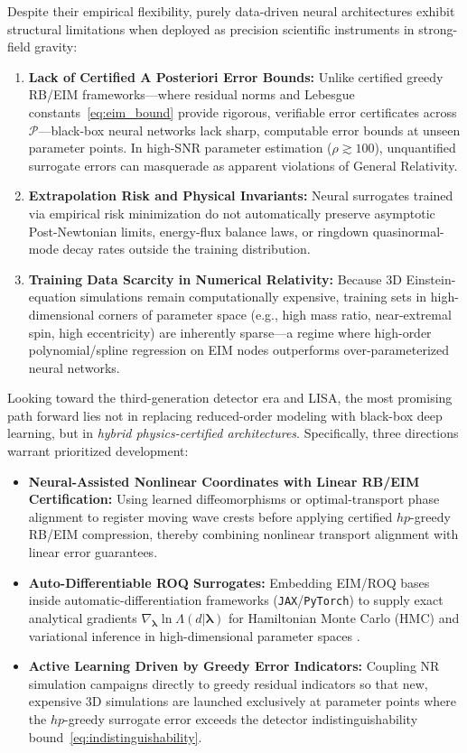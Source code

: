 \documentclass[11pt, a4paper]{article}
\begin{document}
Despite their empirical flexibility, purely data-driven neural architectures exhibit structural limitations when deployed as precision scientific instruments in strong-field gravity:
\begin{enumerate}
    \item \textbf{Lack of Certified A Posteriori Error Bounds:} Unlike certified greedy RB/EIM frameworks---where residual norms and Lebesgue constants~\eqref{eq:eim_bound} provide rigorous, verifiable error certificates across $\mathcal{P}$---black-box neural networks lack sharp, computable error bounds at unseen parameter points. In high-SNR parameter estimation ($\rho \gtrsim 100$), unquantified surrogate errors can masquerade as apparent violations of General Relativity.
    \item \textbf{Extrapolation Risk and Physical Invariants:} Neural surrogates trained via empirical risk minimization do not automatically preserve asymptotic Post-Newtonian limits, energy-flux balance laws, or ringdown quasinormal-mode decay rates outside the training distribution.
    \item \textbf{Training Data Scarcity in Numerical Relativity:} Because 3D Einstein-equation simulations remain computationally expensive, training sets in high-dimensional corners of parameter space (e.g., high mass ratio, near-extremal spin, high eccentricity) are inherently sparse---a regime where high-order polynomial/spline regression on EIM nodes outperforms over-parameterized neural networks.
\end{enumerate}

Looking toward the third-generation detector era and LISA, the most promising path forward lies not in replacing reduced-order modeling with black-box deep learning, but in \emph{hybrid physics-certified architectures}. Specifically, three directions warrant prioritized development:
\begin{itemize}
    \item \textbf{Neural-Assisted Nonlinear Coordinates with Linear RB/EIM Certification:} Using learned diffeomorphisms or optimal-transport phase alignment \cite{Welper2017} to register moving wave crests before applying certified $hp$-greedy RB/EIM compression, thereby combining nonlinear transport alignment with linear error guarantees.
    \item \textbf{Auto-Differentiable ROQ Surrogates:} Embedding EIM/ROQ bases inside automatic-differentiation frameworks (\texttt{JAX}/\texttt{PyTorch}) to supply exact analytical gradients $\nabla_{\boldsymbol{\lambda}} \ln \Lambda(d|\boldsymbol{\lambda})$ for Hamiltonian Monte Carlo (HMC) and variational inference in high-dimensional parameter spaces \cite{Edwards2024}.
    \item \textbf{Active Learning Driven by Greedy Error Indicators:} Coupling NR simulation campaigns directly to greedy residual indicators so that new, expensive 3D simulations are launched exclusively at parameter points where the $hp$-greedy surrogate error exceeds the detector indistinguishability bound~\eqref{eq:indistinguishability}.
\end{itemize}
\end{document}
